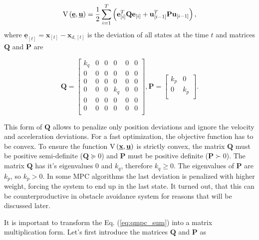 \documentclass[a4paper,11pt,titlepage]{article}
\newcommand{\uvec}{\textbf{\underline{u}}}
\begin{document}
\begin{equation}
\label{eq:qmpc_sum}
\mathrm{V}\left(\textbf{\underline{e}}, \uvec\right) = \frac{1}{2}\sum_{i=1}^{T}\left(\textbf{e}^T_{[i]}\textbf{Q}\textbf{e}_{[i]} + \textbf{u}^T_{[i-1]}\textbf{P}\textbf{u}_{[i-1]}\right),
\end{equation}
where $\underline{\textbf{e}}_{[t]} = \textbf{x}_{[t]} - \textbf{x}_{d,[t]}$ is the deviation of all states at the time $t$  and matrices $\textbf{Q}$ and $\textbf{P}$ are

\begin{equation}
\label{eq:qmpc_weighting_matrices_simple}
\textbf{Q} = \begin{bmatrix}
k_q & 0 & 0 & 0 & 0 & 0 \\
0 & 0 & 0 & 0 & 0 & 0 \\
0 & 0 & 0 & 0 & 0 & 0 \\
0 & 0 & 0 & k_q & 0 & 0 \\
0 & 0 & 0 & 0 & 0 & 0 \\
0 & 0 & 0 & 0 & 0 & 0 \\
\end{bmatrix}, 
\textbf{P} = \begin{bmatrix}
k_p & 0\\
0 & k_p\\
\end{bmatrix}.
\end{equation}

This form of $\textbf{Q}$ allows to penalize only position deviations and ignore the velocity and acceleration deviations. For a fast optimization, the objective function has to be convex. To ensure the function $\mathrm{V}\left(\textbf{\underline{x}}, \uvec\right)$ is strictly convex, the matrix $\textbf{Q}$ must be positive semi-definite ($\textbf{Q} \succeq 0$) and $\textbf{P}$ must be positive definite ($\textbf{P} \succ 0$). The matrix $\textbf{Q}$ has it's eigenvalues $0$ and $k_q$, therefore $k_q \geq 0$. The eigenvalues of $\textbf{P}$ are $k_p$, so $k_p > 0$. In some MPC algorithms the last deviation is penalized with higher weight, forcing the system to end up in the last state. It turned out, that this can be counterproductive in obstacle avoidance system for reasons that will be discussed later.

It is important to transform the Eq. (\ref{eq:qmpc_sum}) into a matrix multiplication form. Let's first introduce the matrices $\textbf{\^Q}$ and $\textbf{\^P}$ as 
\end{document}
